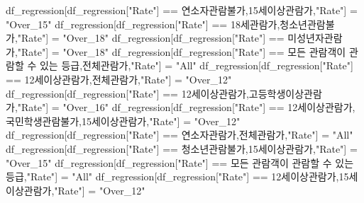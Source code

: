 \documentclass[
]{article}
\newenvironment{Shaded}{\begin{snugshade}}{\end{snugshade}}
\newcommand{\NormalTok}[1]{#1}
\newcommand{\OtherTok}[1]{\textcolor[rgb]{0.56,0.35,0.01}{#1}}
\newcommand{\SpecialCharTok}[1]{\textcolor[rgb]{0.00,0.00,0.00}{#1}}
\newcommand{\StringTok}[1]{\textcolor[rgb]{0.31,0.60,0.02}{#1}}
\begin{document}
\begin{Shaded}
\begin{Highlighting}[]
\NormalTok{df\_regression[df\_regression[}\StringTok{"Rate"}\NormalTok{] }\SpecialCharTok{==} \StringTok{\textquotesingle{}연소자관람불가,15세이상관람가\textquotesingle{}}\NormalTok{,}\StringTok{"Rate"}\NormalTok{] }\OtherTok{=} \StringTok{"Over\_15"}
\NormalTok{df\_regression[df\_regression[}\StringTok{"Rate"}\NormalTok{] }\SpecialCharTok{==} \StringTok{\textquotesingle{}18세관람가,청소년관람불가\textquotesingle{}}\NormalTok{,}\StringTok{"Rate"}\NormalTok{] }\OtherTok{=} \StringTok{"Over\_18"}
\NormalTok{df\_regression[df\_regression[}\StringTok{"Rate"}\NormalTok{] }\SpecialCharTok{==} \StringTok{\textquotesingle{}미성년자관람가\textquotesingle{}}\NormalTok{,}\StringTok{"Rate"}\NormalTok{] }\OtherTok{=} \StringTok{"Over\_18"}
\NormalTok{df\_regression[df\_regression[}\StringTok{"Rate"}\NormalTok{] }\SpecialCharTok{==} \StringTok{\textquotesingle{}모든 관람객이 관람할 수 있는 등급,전체관람가\textquotesingle{}}\NormalTok{,}\StringTok{"Rate"}\NormalTok{] }\OtherTok{=} \StringTok{"All"}
\NormalTok{df\_regression[df\_regression[}\StringTok{"Rate"}\NormalTok{] }\SpecialCharTok{==} \StringTok{\textquotesingle{}12세이상관람가,전체관람가\textquotesingle{}}\NormalTok{,}\StringTok{"Rate"}\NormalTok{] }\OtherTok{=} \StringTok{"Over\_12"}
\NormalTok{df\_regression[df\_regression[}\StringTok{"Rate"}\NormalTok{] }\SpecialCharTok{==} \StringTok{\textquotesingle{}12세이상관람가,고등학생이상관람가\textquotesingle{}}\NormalTok{,}\StringTok{"Rate"}\NormalTok{] }\OtherTok{=} \StringTok{"Over\_16"}
\NormalTok{df\_regression[df\_regression[}\StringTok{"Rate"}\NormalTok{] }\SpecialCharTok{==} \StringTok{\textquotesingle{}12세이상관람가,국민학생관람불가,15세이상관람가\textquotesingle{}}\NormalTok{,}\StringTok{"Rate"}\NormalTok{] }\OtherTok{=} \StringTok{"Over\_12"}
\NormalTok{df\_regression[df\_regression[}\StringTok{"Rate"}\NormalTok{] }\SpecialCharTok{==} \StringTok{\textquotesingle{}연소자관람가,전체관람가\textquotesingle{}}\NormalTok{,}\StringTok{"Rate"}\NormalTok{] }\OtherTok{=} \StringTok{"All"}
\NormalTok{df\_regression[df\_regression[}\StringTok{"Rate"}\NormalTok{] }\SpecialCharTok{==} \StringTok{\textquotesingle{}청소년관람불가,15세이상관람가\textquotesingle{}}\NormalTok{,}\StringTok{"Rate"}\NormalTok{] }\OtherTok{=} \StringTok{"Over\_15"}
\NormalTok{df\_regression[df\_regression[}\StringTok{"Rate"}\NormalTok{] }\SpecialCharTok{==} \StringTok{\textquotesingle{}모든 관람객이 관람할 수 있는 등급\textquotesingle{}}\NormalTok{,}\StringTok{"Rate"}\NormalTok{] }\OtherTok{=} \StringTok{"All"}
\NormalTok{df\_regression[df\_regression[}\StringTok{"Rate"}\NormalTok{] }\SpecialCharTok{==} \StringTok{\textquotesingle{}12세이상관람가,15세이상관람가\textquotesingle{}}\NormalTok{,}\StringTok{"Rate"}\NormalTok{] }\OtherTok{=} \StringTok{"Over\_12"}

\end{Highlighting}
\end{Shaded}
\end{document}
